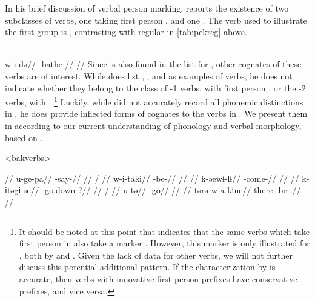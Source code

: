In his brief discussion of \bakairi verbal person marking, \textcite{meira2003bakairi} reports the existence of two subclasses of  verbs, one taking first person , and one .
The verb used to illustrate the first group is   , contrasting with regular   in \cref{tab:pekreg} above.

\bakairi \parencite[][4]{meira2003bakairi}\\
\begingl
\gla w-i-də//
\glb {}-bathe-//
\glft {}//
\endgl
\xe
%
Since  is also found in the list for \arara, other \bakairi cognates of these verbs are of interest.
While \textcite[4]{meira2003bakairi} does list  ,  , and   as examples of  verbs, he does not indicate whether they belong to the class of -1 verbs, with first person , or the -2 verbs, with .%
\footnote{
It should be noted at this point that \textcite{meira2003bakairi} indicates that the same verbs which take first person  in \bakairi also take a  marker .
However, this marker is only illustrated for , both by \textcite{meira2003bakairi} and \textcite{von1892bakairi}.
Given the lack of data for other verbs, we will not further discuss this potential additional pattern.
If the characterization by \citeauthor{meira2003bakairi} is accurate, then verbs with innovative first person prefixes have conservative  prefixes, and vice versa.
}
Luckily, while \textcite{von1892bakairi} did not accurately record all phonemic distinctions in \bakairi \parencite{meira2005bakairi}, he does provide inflected forms of cognates to the \arara verbs in .
We present them in  according to our current understanding of \bakairi phonology and verbal morphology, based on \textcites{wheatley1969bakairi}{meira2003bakairi}{meira2005bakairi}{franchetto2016classes}.

\pex[everyglpreamble=]<bakverbs> \bakairi \parencite[][131, 397, 76, 137, 374, 130]{von1892bakairi}
\begin{multicols}{2}
\begingl
\glpreamble {} //
\gla u-ge-pa//
\glb {}-say-//
\glft {}//
\endgl
{}
\begingl
\glpreamble {} /  //
\gla w-i-taki//
\glb {}-be-//
\glft {}//
\endgl
{}
\begingl
\glpreamble {} //
\gla k-əewɨ-lɨ//
\glb {}-come-//
\glft {}//
\endgl
{}
\begingl
\glpreamble {} //
\gla k-ɨtəgɨ-se//
\glb {}-go.down-?//
\glft {}//
\endgl
{}
\begingl
\glpreamble {} / //
\gla u-tə//
\glb {}-go//
\glft {}//
\endgl
{}
\begingl
\glpreamble {}//
\gla tərə w-a-kɨne//
\glb there -be-.//
\glft {}//
\endgl
\end{multicols}
\xe

